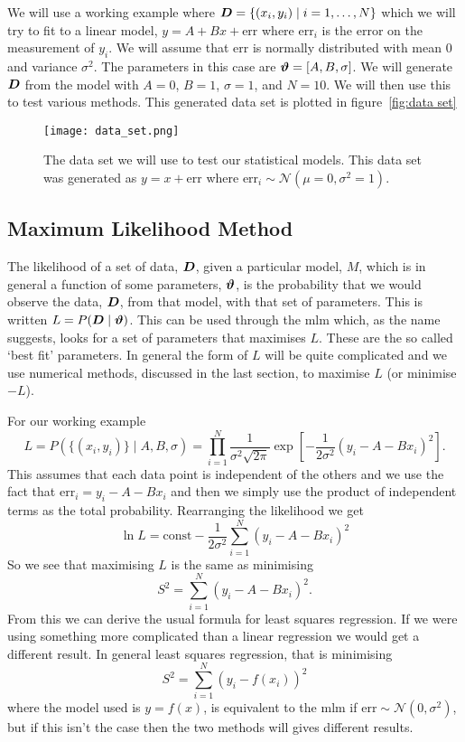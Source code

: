 \documentclass[a4paper]{article}
\newcommand{\st}{\mid}
\begin{document}
    We will use a working example where \(\vv{D} = \{(x_i, y_i)\st i =1, \dotsc, N\}\) which we will try to fit to a linear model, \(y = A + Bx + \text{err}\) where \(\text{err}_i\) is the error on the measurement of \(y_i\).
    We will assume that \(\text{err}\) is normally distributed with mean \(0\) and variance \(\sigma^2\).
    The parameters in this case are \(\bm{\vartheta} = [A, B, \sigma]\).
    We will generate \(\bm{D}\) from the model with \(A = 0\), \(B = 1\), \(\sigma = 1\), and \(N = 10\).
    We will then use this to test various methods.
    This generated data set is plotted in figure~\ref{fig:data set}
    \begin{figure}[ht]
        \centering
        \texttt{[image: data\_set.png]}
        \caption{The data set we will use to test our statistical models.
        This data set was generated as \(y = x + \text{err}\) where \(\text{err}_i\sim\mathcal{N}(\mu=0, \sigma^2=1)\).}
    \end{figure}
    
    \subsection{Maximum Likelihood Method}
    The likelihood of a set of data, \(\bm{D}\), given a particular model, \(M\), which is in general a function of some parameters, \(\bm{\vartheta}\), is the probability that we would observe the data, \(\bm{D}\), from that model, with that set of parameters.
    This is written \(L = P(\vv{D}\st\vv{\vartheta})\).
    This can be used through the \gls{mlm} which, as the name suggests, looks for a set of parameters that maximises \(L\).
    These are the so called `best fit' parameters.
    In general the form of \(L\) will be quite complicated and we use numerical methods, discussed in the last section, to maximise \(L\) (or minimise \(-L\)).
    
    For our working example
    \[L = P(\{(x_i, y_i)\}\st A, B, \sigma) = \prod_{i=1}^{N} \frac{1}{\sigma^2\sqrt{2\pi}}\exp\left[-\frac{1}{2\sigma^2}(y_i - A - Bx_i)^2\right].\]
    This assumes that each data point is independent of the others and we use the fact that \(\text{err}_i = y_i - A - Bx_i\) and then we simply use the product of independent terms as the total probability.
    Rearranging the likelihood we get
    \[\ln L = \text{const} - \frac{1}{2\sigma^2}\sum_{i=1}^{N} (y_i - A - Bx_i)^2\]
    So we see that maximising \(L\) is the same as minimising
    \[S^2 = \sum_{i=1}^{N}(y_i - A - Bx_i)^2.\]
    From this we can derive the usual formula for least squares regression.
    If we were using something more complicated than a linear regression we would get a different result.
    In general least squares regression, that is minimising
    \[S^2 = \sum_{i=1}^{N} (y_i - f(x_i))^2\]
    where the model used is \(y = f(x)\), is equivalent to the \gls{mlm} if \(\text{err}\sim\mathcal{N}(0, \sigma^2)\), but if this isn't the case then the two methods will gives different results.
    
\end{document}

